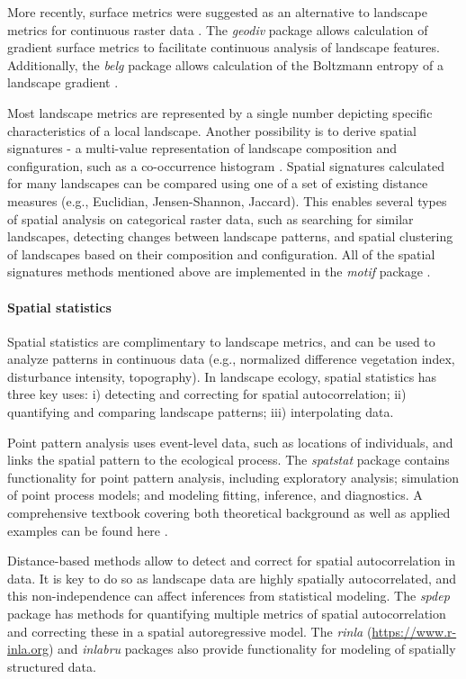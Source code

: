 \documentclass[smallextended]{svjour3}       %
\begin{document}
More recently, surface metrics were suggested as an alternative to landscape metrics for continuous raster data \cite{McGarigal2009}.
The \textit{geodiv} package \cite{Smith2020} allows calculation of gradient surface metrics to facilitate continuous analysis of landscape features.
Additionally, the \textit{belg} package allows calculation of the Boltzmann entropy of a landscape gradient \cite{Nowosad2020}.

Most landscape metrics are represented by a single number depicting specific characteristics of a local landscape.
Another possibility is to derive spatial signatures - a multi-value representation of landscape composition and configuration, such as a co-occurrence histogram \cite{Nowosad2021}.
Spatial signatures calculated for many landscapes can be compared using one of a set of existing distance measures (e.g., Euclidian, Jensen-Shannon, Jaccard).
This enables several types of spatial analysis on categorical raster data, such as searching for similar landscapes, detecting changes between landscape patterns, and spatial clustering of landscapes based on their composition and configuration.
All of the spatial signatures methods mentioned above are implemented in the \textit{motif} package \cite{Nowosad2021}.

\hypertarget{spatial-statistics}{%
\paragraph{Spatial statistics}\label{spatial-statistics}}

Spatial statistics are complimentary to landscape metrics, and can be used to analyze patterns in continuous data (e.g., normalized difference vegetation index, disturbance intensity, topography).
In landscape ecology, spatial statistics has three key uses: i) detecting and correcting for spatial autocorrelation; ii) quantifying and comparing landscape patterns; iii) interpolating data.

Point pattern analysis uses event-level data, such as locations of individuals, and links the spatial pattern to the ecological process.
The \textit{spatstat} package \cite{Baddeley2005} contains functionality for point pattern analysis, including exploratory analysis; simulation of point process models; and modeling fitting, inference, and diagnostics.
A comprehensive textbook covering both theoretical background as well as applied examples can be found here \cite{Baddeley2015}.

Distance-based methods allow to detect and correct for spatial autocorrelation in data.
It is key to do so as landscape data are highly spatially autocorrelated, and this non-independence can affect inferences from statistical modeling.
The \textit{spdep} package \cite{Bivand2013} has methods for quantifying multiple metrics of spatial autocorrelation and correcting these in a spatial autoregressive model.
The \textit{rinla} \cite{Rue2009} (\url{https://www.r-inla.org}) and \textit{inlabru} \cite{Bachl2019} packages also provide functionality for modeling of spatially structured data.
\end{document}
